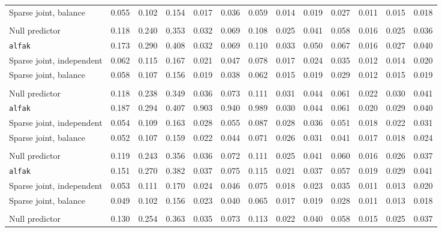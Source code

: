 \begin{center}
\begin{tabular}{l*{12}{r}}
\quad Sparse joint, balance & 0.055 & 0.102 & 0.154 & 0.017 & 0.036 & 0.059 & 0.014 & 0.019 & 0.027 & 0.011 & 0.015 & 0.018 \\
\addlinespace[2pt]
\multicolumn{13}{l}{\textit{500/700, 360 d}} \\
\quad Null predictor & 0.118 & 0.240 & 0.353 & 0.032 & 0.069 & 0.108 & 0.025 & 0.041 & 0.058 & 0.016 & 0.025 & 0.036 \\
\quad \texttt{alfak} & 0.173 & 0.290 & 0.408 & 0.032 & 0.069 & 0.110 & 0.033 & 0.050 & 0.067 & 0.016 & 0.027 & 0.040 \\
\quad Sparse joint, independent & 0.062 & 0.115 & 0.167 & 0.021 & 0.047 & 0.078 & 0.017 & 0.024 & 0.035 & 0.012 & 0.014 & 0.020 \\
\quad Sparse joint, balance & 0.058 & 0.107 & 0.156 & 0.019 & 0.038 & 0.062 & 0.015 & 0.019 & 0.029 & 0.012 & 0.015 & 0.019 \\
\addlinespace[2pt]
\multicolumn{13}{l}{\textit{500/700, 1080 d}} \\
\quad Null predictor & 0.118 & 0.238 & 0.349 & 0.036 & 0.073 & 0.111 & 0.031 & 0.044 & 0.061 & 0.022 & 0.030 & 0.041 \\
\quad \texttt{alfak} & 0.187 & 0.294 & 0.407 & 0.903 & 0.940 & 0.989 & 0.030 & 0.044 & 0.061 & 0.020 & 0.029 & 0.040 \\
\quad Sparse joint, independent & 0.054 & 0.109 & 0.163 & 0.028 & 0.055 & 0.087 & 0.028 & 0.036 & 0.051 & 0.018 & 0.022 & 0.031 \\
\quad Sparse joint, balance & 0.052 & 0.107 & 0.159 & 0.022 & 0.044 & 0.071 & 0.026 & 0.031 & 0.041 & 0.017 & 0.018 & 0.024 \\
\addlinespace[2pt]
\multicolumn{13}{l}{\textit{500/700, bottleneck}} \\
\quad Null predictor & 0.119 & 0.243 & 0.356 & 0.036 & 0.072 & 0.111 & 0.025 & 0.041 & 0.060 & 0.016 & 0.026 & 0.037 \\
\quad \texttt{alfak} & 0.151 & 0.270 & 0.382 & 0.037 & 0.075 & 0.115 & 0.021 & 0.037 & 0.057 & 0.019 & 0.029 & 0.041 \\
\quad Sparse joint, independent & 0.053 & 0.111 & 0.170 & 0.024 & 0.046 & 0.075 & 0.018 & 0.023 & 0.035 & 0.011 & 0.013 & 0.020 \\
\quad Sparse joint, balance & 0.049 & 0.102 & 0.156 & 0.023 & 0.040 & 0.065 & 0.017 & 0.019 & 0.028 & 0.011 & 0.013 & 0.018 \\
\addlinespace[2pt]
\multicolumn{13}{l}{\textit{100/3000, 360 d}} \\
\quad Null predictor & 0.130 & 0.254 & 0.363 & 0.035 & 0.073 & 0.113 & 0.022 & 0.040 & 0.058 & 0.015 & 0.025 & 0.037 \\

\end{tabular}
\end{center}
